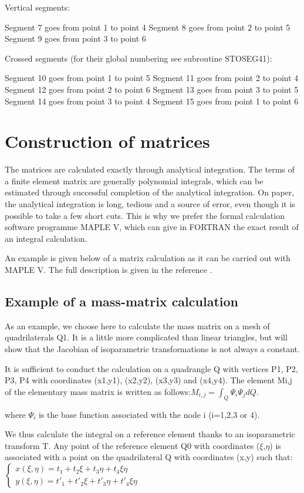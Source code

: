 Vertical segments:

Segment 7 goes from point 1 to point 4
Segment 8 goes from point 2 to point 5
Segment 9 goes from point 3 to point 6

Crossed segments (for their global numbering see subroutine STOSEG41):

Segment 10 goes from point 1 to point 5
Segment 11 goes from point 2 to point 4
Segment 12 goes from point 2 to point 6
Segment 13 goes from point 3 to point 5
Segment 14 goes from point 3 to point 4
Segment 15 goes from point 1 to point 6

\section{Construction of matrices}

The \bief matrices are calculated exactly through analytical integration. The
terms of a finite element matrix are generally polynomial integrals, which can
be estimated through successful completion of the analytical integration. On
paper, the analytical integration is long, tedious and a source of error, even
though it is possible to take a few short cuts. This is why we prefer the
formal calculation software programme MAPLE V, which can give in FORTRAN
the exact result of an integral calculation.

An example is given below of a matrix calculation as it can be carried out with
MAPLE V. The full description is given in the reference \citet{HervouetMaple}.

\subsection{Example of a mass-matrix calculation}

As an example, we choose here to calculate the mass matrix on a mesh of
quadrilaterals Q1. It is a little more complicated than linear triangles, but
will show that the Jacobian of isoparametric transformations is not always a
constant.

It is sufficient to conduct the calculation on a quadrangle Q with vertices P1,
P2, P3, P4 with coordinates (x1,y1), (x2,y2), (x3,y3) and (x4,y4). The element
Mi,j of the elementary mass matrix is written as follows:$M_{i,j} =\int
_{Q}\Psi _{i}  \Psi _{j} dQ$.

where $\Psi _{i}$ is the base function associated with the node i (i=1,2,3 or
4).

We thus calculate the integral on a reference element thanks to an
isoparametric transform T. Any point of the reference element Q0 with
coordinates ($\xi$,$\eta$) is associated with a point on the quadrilateral Q
with coordinates (x,y) such that:
$\left\{
  \begin{array}{l}
x(\xi,\eta) = t_{1} + t_{2}\xi + t_{3}\eta + t_{4}\xi\eta \\
y(\xi,\eta) = t'_{1} + t'_{2}\xi + t'_{3}\eta + t'_{4}\xi\eta
\end{array}\right.$

